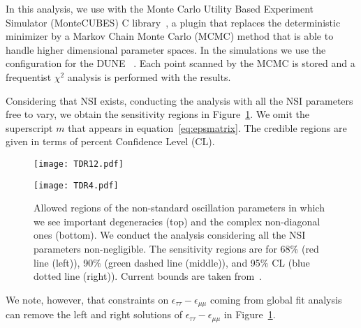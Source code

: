 In this analysis, we use   with the Monte Carlo Utility Based Experiment Simulator (MonteCUBES) C library~\cite{Blennow:2009pk}, a plugin that replaces the deterministic   minimizer by a Markov Chain Monte Carlo (MCMC) method that is able to handle higher dimensional parameter spaces. In the simulations we use the configuration for the DUNE ~\cite{Alion:2016uaj}. Each point scanned by the MCMC is stored and a frequentist $\chi^2$ analysis is performed with the results.

Considering that NSI exists, conducting the analysis with all the NSI parameters free to vary, we obtain the sensitivity regions in Figure~\ref{fig:nsi}. We omit the superscript $m$ that appears in equation~\ref{eq:epsmatrix}. 
The credible regions are given in terms of percent Confidence Level (CL).
\begin{figure}[!htb]
	\centering
    \texttt{[image: TDR12.pdf]}
    
    \texttt{[image: TDR4.pdf]}
   \caption[NSI parameters. Allowed regions.]{\label{fig:nsi}Allowed regions of the non-standard oscillation parameters in which we see important degeneracies (top) and the complex non-diagonal ones (bottom). We conduct the analysis considering all the NSI parameters non-negligible. The sensitivity regions are for 68\% (red line (left)), 90\% (green dashed line (middle)), and 95\% CL (blue dotted line (right)). Current bounds are taken from~\cite{Gonzalez-Garcia:2013usa}.}
\end{figure}
We note, however, that constraints on $\epsilon_{\tau\tau}-\epsilon_{\mu\mu}$ coming from global fit analysis~\cite{Gonzalez-Garcia:2013usa,Miranda:2015dra,Farzan:2017xzy,Esteban:2018ppq} can remove the left and right solutions of $\epsilon_{\tau\tau}-\epsilon_{\mu\mu}$ in Figure~\ref{fig:nsi}.


